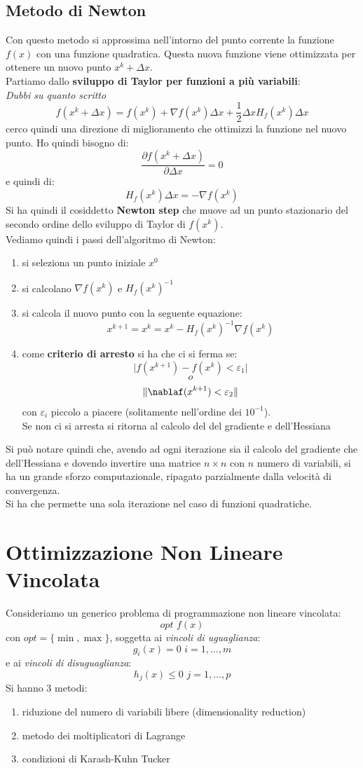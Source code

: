 \documentclass[a4paper,12pt, oneside]{book}
\begin{document}
\subsection{Metodo di Newton}
Con questo metodo si approssima nell'intorno del punto corrente la
funzione $f(x)$ con una funzione quadratica. Questa nuova funzione
viene ottimizzata per ottenere un nuovo punto $x^k+\Delta x$.\\
Partiamo dallo \textbf{sviluppo di Taylor per funzioni a più
  variabili}:\\
\textit{Dubbi su quanto scritto}
\[f(x^k+\Delta x)=f(x^k)+\nabla f(x^k)\Delta x+\frac{1}{2}\Delta x
  H_f(x^k)\Delta x\]
cerco quindi una direzione di miglioramento che ottimizzi la funzione
nel nuovo punto. Ho quindi bisogno di:
\[\frac{\partial f(x^k+\Delta x)}{\partial \Delta x}=0\]
e quindi di:
\[H_f(x^k)\Delta x=-\nabla f(x^k)\]
Si ha quindi il cosiddetto \textbf{Newton step} che muove ad un punto
stazionario del secondo ordine dello sviluppo di Taylor di $f(x^k)$.\\
Vediamo quindi i passi dell'algoritmo di Newton:
\begin{enumerate}
  \item si seleziona un punto iniziale $x^0$
  \item si calcolano $\nabla f(x^k)$ e $H_f(x^k)^{-1}$
  \item si calcola il nuovo punto con la seguente equazione:
  \[x^{k+1}=x^k=x^k-H_f(x^k)^{-1}\nabla f(x^k)\]
  \item come \textbf{criterio di arresto} si ha che ci si ferma se:
  \[\vert f(x^{k+1})-f(x^k)<\varepsilon_1 \vert\]
  \[o\]
  \[\Vert \nablaf(x^{k+1})<\varepsilon_2 \Vert\]
  con $\varepsilon_i$ piccolo a piacere (solitamente nell'ordine dei
  $10^{-1}$).\\ 
  Se non ci si arresta si ritorna al calcolo del del gradiente e dell'Hessiana
\end{enumerate}
Si può notare quindi che, avendo ad ogni iterazione sia il calcolo del
gradiente che dell'Hessiana e dovendo invertire una matrice $n\times
n$ con $n$ numero di variabili, si ha un grande sforzo computazionale,
ripagato parzialmente dalla velocità di convergenza.\\
Si ha che permette una sola iterazione nel caso di funzioni
quadratiche.
\section{Ottimizzazione Non Lineare Vincolata}
Consideriamo un generico problema di programmazione non lineare
vincolata:
\[opt\,\,f(x)\]
con $opt=\{\min,\max\}$, soggetta ai \textit{vincoli di uguaglianza}:
\[g_i(x)=0\,\,i=1,\ldots, m\]
e ai \textit{vincoli di disuguaglianza}:
\[h_j(x)\leq0\,\,j=1,\ldots, p\]
Si hanno 3 metodi:
\begin{enumerate}
  \item riduzione del numero di variabili libere (dimensionality
  reduction)
  \item metodo dei moltiplicatori di Lagrange
  \item condizioni di Karash-Kuhn Tucker
\end{enumerate}
\end{document}
